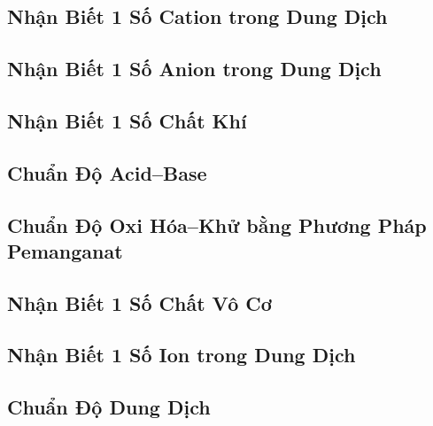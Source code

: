 \documentclass{article}
\numberwithin{equation}{section}
\begin{document}
\subsection{Nhận Biết 1 Số Cation trong Dung Dịch}


\subsection{Nhận Biết 1 Số Anion trong Dung Dịch}


\subsection{Nhận Biết 1 Số Chất Khí}


\subsection{Chuẩn Độ Acid--Base}


\subsection{Chuẩn Độ Oxi Hóa--Khử bằng Phương Pháp Pemanganat}


\subsection{Nhận Biết 1 Số Chất Vô Cơ}


\subsection{Nhận Biết 1 Số Ion trong Dung Dịch}


\subsection{Chuẩn Độ Dung Dịch}
\end{document}
